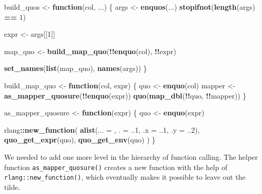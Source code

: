 \documentclass[]{book}
\newenvironment{Shaded}{\begin{snugshade}}{\end{snugshade}}
\newcommand{\ControlFlowTok}[1]{\textcolor[rgb]{0.13,0.29,0.53}{\textbf{#1}}}
\newcommand{\DataTypeTok}[1]{\textcolor[rgb]{0.13,0.29,0.53}{#1}}
\newcommand{\DecValTok}[1]{\textcolor[rgb]{0.00,0.00,0.81}{#1}}
\newcommand{\KeywordTok}[1]{\textcolor[rgb]{0.13,0.29,0.53}{\textbf{#1}}}
\newcommand{\NormalTok}[1]{#1}
\newcommand{\OperatorTok}[1]{\textcolor[rgb]{0.81,0.36,0.00}{\textbf{#1}}}
\newcommand{\StringTok}[1]{\textcolor[rgb]{0.31,0.60,0.02}{#1}}
\begin{document}
\begin{Shaded}
\begin{Highlighting}[]
\NormalTok{build_quos <-}\StringTok{ }\ControlFlowTok{function}\NormalTok{(col, ...) \{}
\NormalTok{  args <-}\StringTok{ }\KeywordTok{enquos}\NormalTok{(...)}
  \KeywordTok{stopifnot}\NormalTok{(}\KeywordTok{length}\NormalTok{(args) }\OperatorTok{==}\StringTok{ }\DecValTok{1}\NormalTok{)}

\NormalTok{  expr <-}\StringTok{ }\NormalTok{args[[}\DecValTok{1}\NormalTok{]]}

\NormalTok{  map_quo <-}\StringTok{ }\KeywordTok{build_map_quo}\NormalTok{(}\OperatorTok{!!}\KeywordTok{enquo}\NormalTok{(col), }\OperatorTok{!!}\NormalTok{expr)}

  \KeywordTok{set_names}\NormalTok{(}\KeywordTok{list}\NormalTok{(map_quo), }\KeywordTok{names}\NormalTok{(args))}
\NormalTok{\}}

\NormalTok{build_map_quo <-}\StringTok{ }\ControlFlowTok{function}\NormalTok{(col, expr) \{}
\NormalTok{  quo <-}\StringTok{ }\KeywordTok{enquo}\NormalTok{(col)}
\NormalTok{  mapper <-}\StringTok{ }\KeywordTok{as_mapper_quosure}\NormalTok{(}\OperatorTok{!!}\KeywordTok{enquo}\NormalTok{(expr))}
  \KeywordTok{quo}\NormalTok{(}\KeywordTok{map_dbl}\NormalTok{(}\OperatorTok{!!}\NormalTok{quo, }\OperatorTok{!!}\NormalTok{mapper))}
\NormalTok{\}}

\NormalTok{as_mapper_quosure <-}\StringTok{ }\ControlFlowTok{function}\NormalTok{(expr) \{}
\NormalTok{  quo <-}\StringTok{ }\KeywordTok{enquo}\NormalTok{(expr)}

\NormalTok{  rlang}\OperatorTok{::}\KeywordTok{new_function}\NormalTok{(}
    \KeywordTok{alist}\NormalTok{(}\DataTypeTok{... =}\NormalTok{ , }\DataTypeTok{. =}\NormalTok{ ..}\DecValTok{1}\NormalTok{, }\DataTypeTok{.x =}\NormalTok{ ..}\DecValTok{1}\NormalTok{, }\DataTypeTok{.y =}\NormalTok{ ..}\DecValTok{2}\NormalTok{),}
    \KeywordTok{quo_get_expr}\NormalTok{(quo),}
    \KeywordTok{quo_get_env}\NormalTok{(quo)}
\NormalTok{  )}
\NormalTok{\}}
\end{Highlighting}
\end{Shaded}

We needed to add one more level in the hierarchy of function calling.
The helper function \texttt{as\_mapper\_quosure()} creates a new function with the help of \texttt{rlang::new\_function()}, which eventually makes it possible to leave out the tilde.

\begin{Shaded}
\end{Shaded}
\end{document}
